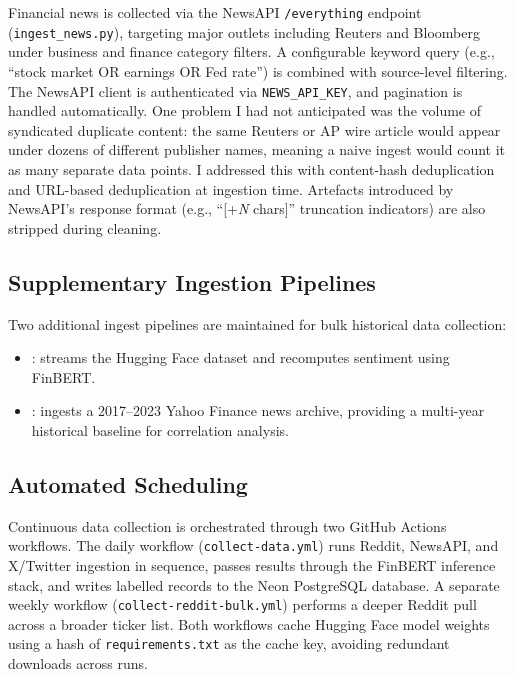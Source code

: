 Financial news is collected via the NewsAPI \texttt{/everything} endpoint (\texttt{ingest\_news.py}), targeting major outlets including Reuters and Bloomberg under business and finance category filters. A configurable keyword query (e.g., ``stock market OR earnings OR Fed rate'') is combined with source-level filtering. The NewsAPI client is authenticated via \texttt{NEWS\_API\_KEY}, and pagination is handled automatically. One problem I had not anticipated was the volume of syndicated duplicate content: the same Reuters or AP wire article would appear under dozens of different publisher names, meaning a naive ingest would count it as many separate data points. I addressed this with content-hash deduplication and URL-based deduplication at ingestion time. Artefacts introduced by NewsAPI's response format (e.g., ``[+\textit{N} chars]'' truncation indicators) are also stripped during cleaning.

\subsection{Supplementary Ingestion Pipelines}

Two additional ingest pipelines are maintained for bulk historical data collection:
\begin{itemize}
    \item {}: streams the Hugging Face dataset  and recomputes sentiment using FinBERT.
    \item {}: ingests a 2017--2023 Yahoo Finance news archive, providing a multi-year historical baseline for correlation analysis.
\end{itemize}

\subsection{Automated Scheduling}

Continuous data collection is orchestrated through two GitHub Actions workflows.  The daily workflow (\texttt{collect-data.yml}) runs Reddit, NewsAPI, and X/Twitter ingestion in sequence, passes results through the FinBERT inference stack, and writes labelled records to the Neon PostgreSQL database.  A separate weekly workflow (\texttt{collect-reddit-bulk.yml}) performs a deeper Reddit pull across a broader ticker list.  Both workflows cache Hugging Face model weights using a hash of \texttt{requirements.txt} as the cache key, avoiding redundant downloads across runs.

